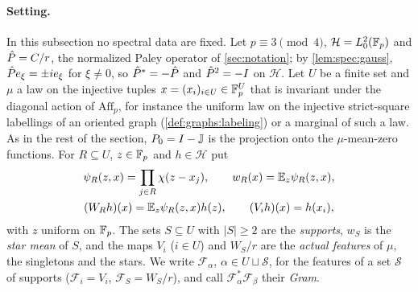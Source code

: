 \paragraph{Setting.}
In this subsection no spectral data are fixed. Let $p\equiv3\pmod4$,
$\mathcal H=L^2_0(\mathbb F_p)$ and $\hat P=C/r$, the normalized Paley operator of
\cref{sec:notation}; by \cref{lem:spec:gauss}, $\hat P e_\xi=\pm ie_\xi$ for $\xi\ne0$,
so $\hat P^*=-\hat P$ and $\hat P^2=-I$ on $\mathcal H$. Let $U$ be a finite set and $\mu$
a law on the injective tuples $x=(x_i)_{i\in U}\in\mathbb F_p^U$ that is invariant under
the diagonal action of $\mathrm{Aff}_p$, for instance the uniform law on the
injective strict-square labellings of an oriented graph
(\cref{def:graphs:labeling}) or a marginal of such a law. As in the rest of the
section, $P_0=I-\mathbb J$ is the projection onto the $\mu$-mean-zero functions. For
$R\subseteq U$, $z\in\mathbb F_p$ and $h\in\mathcal H$ put
\begin{gather*}
  \psi_R(z,x)=\prod_{j\in R}\chi(z-x_j),\qquad w_R(x)=\mathbb E_z\psi_R(z,x),\\
  (W_Rh)(x)=\mathbb E_z\psi_R(z,x)h(z),\qquad (V_ih)(x)=h(x_i),
\end{gather*}
with $z$ uniform on $\mathbb F_p$. The sets $S\subseteq U$ with $|S|\ge2$ are the
\emph{supports}, $w_S$ is the \emph{star mean} of $S$, and the maps $V_i$
($i\in U$) and $W_S/r$ are the \emph{actual features} of $\mu$, the singletons and
the stars. We write $\mathcal F_\alpha$, $\alpha\in U\sqcup\mathcal S$, for the features
of a set $\mathcal S$ of supports ($\mathcal F_i=V_i$, $\mathcal F_S=W_S/r$), and call
$\mathcal F_\alpha^*\mathcal F_\beta$ their \emph{Gram}.

